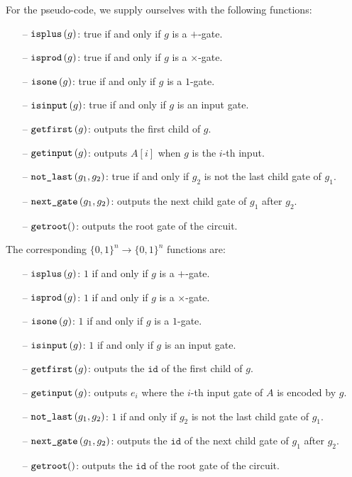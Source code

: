 For the pseudo-code, we supply ourselves with the following functions:

\begin{itemize}
	\item[--] $\texttt{isplus}\left( g \right)$: true if and only if $g$ is a $+$-gate.
	\item[--] $\texttt{isprod}\left(g \right)$: true if and only if $g$ is a $\times$-gate.
	\item[--] $\texttt{isone}\left(g \right)$: true if and only if $g$ is a $1$-gate.
	\item[--] $\texttt{isinput}\left(g \right)$: true if and only if $g$ is an input gate.
	\item[--] $\texttt{getfirst}\left(g \right)$: outputs the first child of $g$.
	\item[--] $\texttt{getinput}\left(g \right)$: outputs $A[i]$ when $g$ is the $i$-th input.
	\item[--] $\texttt{not{\_}last}\left(g_1,g_2 \right)$: true if and only if $g_2$ is not the last child gate of $g_1$.
	\item[--] $\texttt{next{\_}gate}\left(g_1, g_2 \right)$: outputs the next child gate of $g_1$ after $g_2$.
	\item[--] $\texttt{getroot}()$: outputs the root gate of the circuit.
\end{itemize}

The corresponding $\lbrace 0,1 \rbrace^n\rightarrow\lbrace 0,1 \rbrace^n$ functions are:

\begin{itemize}
	\item[--] $\texttt{isplus}\left( g \right)$: $1$ if and only if $g$ is a $+$-gate.
	\item[--] $\texttt{isprod}\left(g \right)$: $1$ if and only if $g$ is a $\times$-gate.
	\item[--] $\texttt{isone}\left(g \right)$: $1$ if and only if $g$ is a $1$-gate.
	\item[--] $\texttt{isinput}\left(g \right)$: $1$ if and only if $g$ is an input gate.
	\item[--] $\texttt{getfirst}\left(g \right)$: outputs the $\texttt{id}$ of the first child of $g$.
	\item[--] $\texttt{getinput}\left(g \right)$: outputs $e_i$ where the $i$-th input gate of $A$ is encoded by $g$.
	\item[--] $\texttt{not{\_}last}\left(g_1,g_2 \right)$: $1$ if and only if $g_2$ is not the last child gate of $g_1$.
	\item[--] $\texttt{next{\_}gate}\left(g_1, g_2 \right)$: outputs the $\texttt{id}$ of the next child gate of $g_1$ after $g_2$.
	\item[--] $\texttt{getroot}()$: outputs the $\texttt{id}$ of the root gate of the circuit.
\end{itemize}

